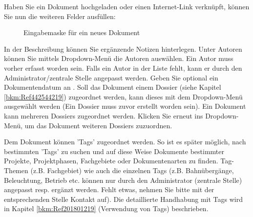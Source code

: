 \vspace{\baselineskip}

Haben Sie ein Dokument hochgeladen oder einen Internet-Link verknüpft, können Sie nun die weiteren Felder ausfüllen:

\begin{figure}[H]
\caption{Eingabemaske für ein neues Dokument}
\end{figure}

\vspace{\baselineskip}

In der Beschreibung  können Sie ergänzende Notizen hinterlegen. Unter Autoren  können Sie mittels Dropdown-Menü die Autoren auswählen. Ein Autor muss vorher erfasst worden sein. Falls ein Autor in der Liste fehlt, kann er durch den Administrator/zentrale Stelle angepasst werden. Geben Sie optional ein Dokumentendatum an . Soll das Dokument einem Dossier (siehe Kapitel \ref{bkm:Ref442544219}) zugeordnet werden, kann dieses mit dem Dropdown-Menü  ausgewählt werden (Ein Dossier muss zuvor erstellt worden sein). Ein Dokument kann mehreren Dossiers zugeordnet werden. Klicken Sie erneut ins Dropdown-Menü, um das Dokument weiteren Dossiers zuzuordnen. \newline

Dem Dokument können 'Tags'  zugeordnet werden. So ist es später möglich, nach bestimmten 'Tags' zu suchen und auf diese Weise Dokumente bestimmter Projekte, Projektphasen, Fachgebiete oder Dokumentenarten zu finden. Tag-Themen (z.B. Fachgebiet) wie auch die einzelnen Tags (z.B. Bahnübergänge, Beleuchtung, Betrieb etc. können nur durch den Administrator (zentrale Stelle) angepasst resp. ergänzt werden. Fehlt etwas, nehmen Sie bitte mit der entsprechenden Stelle Kontakt auf). Die detaillierte Handhabung mit Tags wird in Kapitel \ref{bkm:Ref201801219} (Verwendung von Tags) beschrieben. \newline

